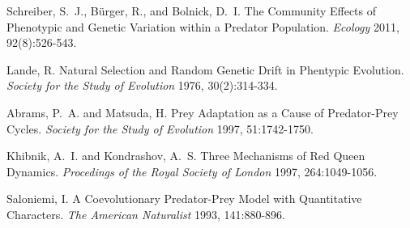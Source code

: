 \documentclass{amsart}
\theoremstyle{definition}
\theoremstyle{remark}
\numberwithin{equation}{section}
\begin{document}
\pagebreak

\begin{thebibliography}{10}

Schreiber, S.~J., B\"urger,  R., and Bolnick,  D.~I.
The Community Effects of Phenotypic and Genetic Variation within a Predator Population.
\emph{Ecology}
2011,  92(8):526-543. 

Lande, R.
Natural Selection and Random Genetic Drift in Phentypic Evolution.
\emph{Society for the Study of Evolution}
1976, 30(2):314-334.

Abrams, P.~A. and Matsuda, H.
Prey Adaptation as a Cause of Predator-Prey Cycles.
\emph{Society for the Study of Evolution}
1997, 51:1742-1750.

Khibnik, A.~I. and Kondrashov, A.~S.
Three Mechanisms of Red Queen Dynamics.
\emph{Procedings of the Royal Society of London}
1997, 264:1049-1056.

Saloniemi, I.
A Coevolutionary Predator-Prey Model with Quantitative Characters.
\emph{The American Naturalist}
1993, 141:880-896.

\end{thebibliography}


































\pagebreak
\end{document}
